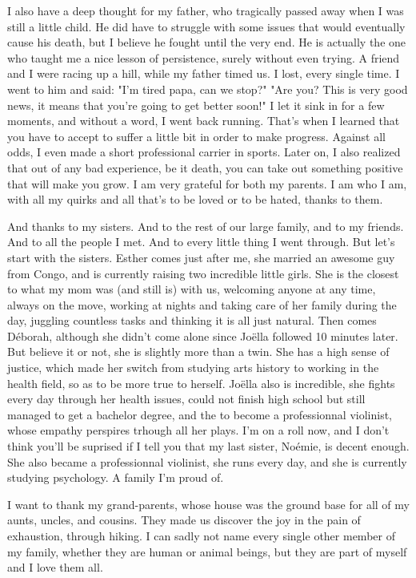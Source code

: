 I also have a deep thought for my father, who tragically passed away when I was still a little child. He did have to struggle with some issues that would eventually cause his death, but I believe he fought until the very end. He is actually the one who taught me a nice lesson of persistence, surely without even trying. A friend and I were racing up a hill, while my father timed us. I lost, every single time. I went to him and said: "I'm tired papa, can we stop?" "Are you? This is very good news, it means that you're going to get better soon!" I let it sink in for a few moments, and without a word, I went back running. That's when I learned that you have to accept to suffer a little bit in order to make progress. Against all odds, I even made a short professional carrier in sports. Later on, I also realized that out of any bad experience, be it death, you can take out something positive that will make you grow. I am very grateful for both my parents. I am who I am, with all my quirks and all that's to be loved or to be hated, thanks to them.

And thanks to my sisters. And to the rest of our large family, and to my friends. And to all the people I met. And to every little thing I went through. But let's start with the sisters. Esther comes just after me, she married an awesome guy from Congo, and is currently raising two incredible little girls. She is the closest to what my mom was (and still is) with us, welcoming anyone at any time, always on the move, working at nights and taking care of her family during the day, juggling countless tasks and thinking it is all just natural. Then comes Déborah, although she didn't come alone since Joëlla followed 10 minutes later. But believe it or not, she is slightly more than a twin. She has a high sense of justice, which made her switch from studying arts history to working in the health field, so as to be more true to herself. Joëlla also is incredible, she fights every day through her health issues, could not finish high school but still managed to get a bachelor degree, and the to become a professionnal violinist, whose empathy perspires trhough all her plays. I'm on a roll now, and I don't think you'll be suprised if I tell you that my last sister, Noémie, is decent enough. She also became a professionnal violinist, she runs every day, and she is currently studying psychology. A family I'm proud of.

I want to thank my grand-parents, whose house was the ground base for all of my aunts, uncles, and cousins. They made us discover the joy in the pain of exhaustion, through hiking. I can sadly not name every single other member of my family, whether they are human or animal beings, but they are part of myself and I love them all. 

